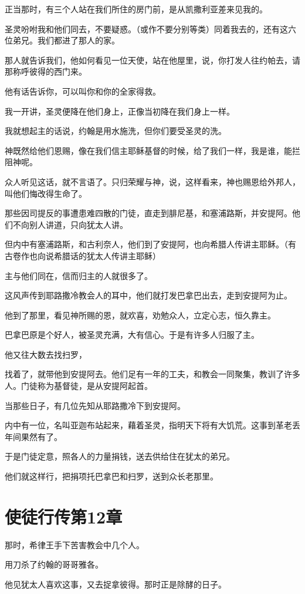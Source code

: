 \documentclass[12pt,oneside]{book}
\begin{document}
正当那时，有三个人站在我们所住的房门前，是从凯撒利亚差来见我的。

圣灵吩咐我和他们同去，不要疑惑。（或作不要分别等类）同着我去的，还有这六位弟兄。我们都进了那人的家。

那人就告诉我们，他如何看见一位天使，站在他屋里，说，你打发人往约帕去，请那称呼彼得的西门来。

他有话告诉你，可以叫你和你的全家得救。

我一开讲，圣灵便降在他们身上，正像当初降在我们身上一样。

我就想起主的话说，约翰是用水施洗，但你们要受圣灵的洗。

神既然给他们恩赐，像在我们信主耶稣基督的时候，给了我们一样，我是谁，能拦阻神呢。

众人听见这话，就不言语了。只归荣耀与神，说，这样看来，神也赐恩给外邦人，叫他们悔改得生命了。

那些因司提反的事遭患难四散的门徒，直走到腓尼基，和塞浦路斯，并安提阿。他们不向别人讲道，只向犹太人讲。

但内中有塞浦路斯，和古利奈人，他们到了安提阿，也向希腊人传讲主耶稣。（有古卷作也向说希腊话的犹太人传讲主耶稣）

主与他们同在，信而归主的人就很多了。

这风声传到耶路撒冷教会人的耳中，他们就打发巴拿巴出去，走到安提阿为止。

他到了那里，看见神所赐的恩，就欢喜，劝勉众人，立定心志，恒久靠主。

巴拿巴原是个好人，被圣灵充满，大有信心。于是有许多人归服了主。

他又往大数去找扫罗，

找着了，就带他到安提阿去。他们足有一年的工夫，和教会一同聚集，教训了许多人。门徒称为基督徒，是从安提阿起首。

当那些日子，有几位先知从耶路撒冷下到安提阿。

内中有一位，名叫亚迦布站起来，藉着圣灵，指明天下将有大饥荒。这事到革老丢年间果然有了。

于是门徒定意，照各人的力量捐钱，送去供给住在犹太的弟兄。

他们就这样行，把捐项托巴拿巴和扫罗，送到众长老那里。

\chapter{使徒行传第12章}
那时，希律王手下苦害教会中几个人。

用刀杀了约翰的哥哥雅各。

他见犹太人喜欢这事，又去捉拿彼得。那时正是除酵的日子。
\end{document}
